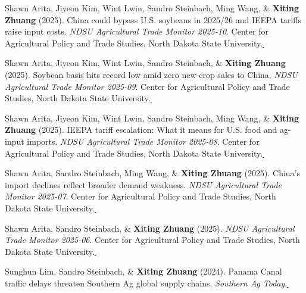 \documentclass[10.8 pt,letterpaper]{article}
\newcommand{\paperlink}[1]{\href{#1}{\,\small\faExternalLink}}
\renewenvironment{itemize}{
	\begin{list}{}{
			\setlength{\leftmargin}{1.5em}
		}
	}{
	\end{list}
}
\begin{document}
\begin{itemize}
		\item[-] Shawn Arita, Jiyeon Kim, Wint Lwin, Sandro Steinbach, Ming Wang, \& \textbf{Xiting Zhuang} (2025). China could bypass U.S. soybeans in 2025/26 and IEEPA tariffs raise input costs. \textit{NDSU Agricultural Trade Monitor 2025-10}. Center for Agricultural Policy and Trade Studies, North Dakota State University.\paperlink{https://www.capts-ndsu.com/_files/ugd/3c6228_8ba2525b1280446489c686bb8f45bef1.pdf}
		
		\item[-] Shawn Arita, Jiyeon Kim, Wint Lwin, Sandro Steinbach, \& \textbf{Xiting Zhuang} (2025). Soybean basis hits record low amid zero new-crop sales to China. \textit{NDSU Agricultural Trade Monitor 2025-09}. Center for Agricultural Policy and Trade Studies, North Dakota State University.\paperlink{https://www.capts-ndsu.com/_files/ugd/3c6228_a43f5e48de2d400f88da267c58abfc6f.pdf}
		
		\item[-] Shawn Arita, Jiyeon Kim, Wint Lwin, Sandro Steinbach, Ming Wang, \& \textbf{Xiting Zhuang} (2025). IEEPA tariff escalation: What it means for U.S. food and ag-input imports. \textit{NDSU Agricultural Trade Monitor 2025-08}. Center for Agricultural Policy and Trade Studies, North Dakota State University.\paperlink{https://www.capts-ndsu.com/_files/ugd/3c6228_44202bdfcc8f4c01af0995141c8215fe.pdf}
		
		\item[-] Shawn Arita, Sandro Steinbach, Ming Wang, \& \textbf{Xiting Zhuang} (2025). China's import declines reflect broader demand weakness. \textit{NDSU Agricultural Trade Monitor 2025-07}. Center for Agricultural Policy and Trade Studies, North Dakota State University.\paperlink{https://www.capts-ndsu.com/_files/ugd/3c6228_d4656ab5a23e4cb2a2d9572e4817be85.pdf}
		
		\item[-] Shawn Arita, Sandro Steinbach, \& \textbf{Xiting Zhuang} (2025). \textit{NDSU Agricultural Trade Monitor 2025-06}. Center for Agricultural Policy and Trade Studies, North Dakota State University.\paperlink{https://www.capts-ndsu.com/_files/ugd/3c6228_275669f200b147d6993ae2fef14c7edc.pdf}
		
		\item[-] Sunghun Lim, Sandro Steinbach, \& \textbf{Xiting Zhuang} (2024). Panama Canal traffic delays threaten Southern Ag global supply chains. \textit{Southern Ag Today}.\paperlink{https://southernagtoday.org/2024/01/18/panama-canal-traffic-delays-threaten-southern-ag-global-supply-chains/}
		

\end{itemize}
\end{document}

